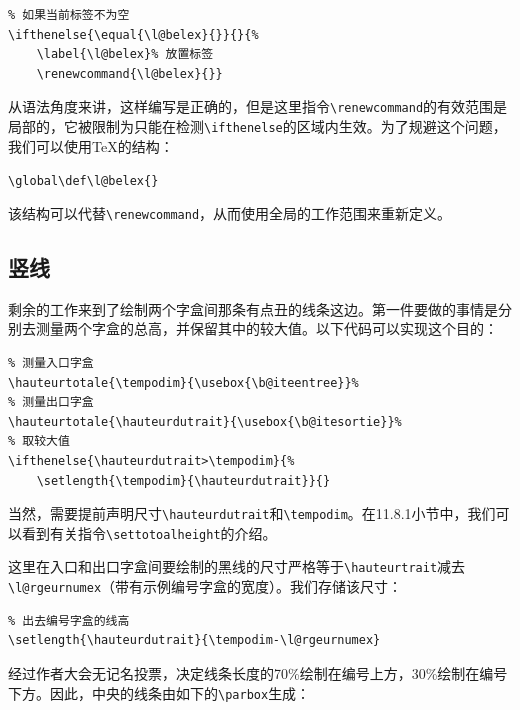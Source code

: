 \begin{dmd}
\begin{verbatim}
% 如果当前标签不为空 
\ifthenelse{\equal{\l@belex}{}}{}{%
    \label{\l@belex}% 放置标签
    \renewcommand{\l@belex}{}}\end{verbatim}
\end{dmd}

从语法角度来讲，这样编写是正确的，但是这里指令\verb|\renewcommand|的有效范围是局部的，它被限制为只能在检测\verb|\ifthenelse|的区域内生效。为了规避这个问题，我们可以使用\TeX 的结构：

\begin{dmd}
\verb|\global\def\l@belex{}|
\end{dmd}

该结构可以代替\verb|\renewcommand|，从而使用全局的工作范围来重新定义。

\subsection{竖线}

剩余的工作来到了绘制两个字盒间那条有点丑的线条这边。第一件要做的事情是分别去测量两个字盒的总高，并保留其中的较大值。以下代码可以实现这个目的：

\begin{dmd}
\begin{verbatim}
% 测量入口字盒
\hauteurtotale{\tempodim}{\usebox{\b@iteentree}}%
% 测量出口字盒
\hauteurtotale{\hauteurdutrait}{\usebox{\b@itesortie}}% 
% 取较大值
\ifthenelse{\hauteurdutrait>\tempodim}{%
    \setlength{\tempodim}{\hauteurdutrait}}{}\end{verbatim}
\end{dmd}

当然，需要提前声明尺寸\verb|\hauteurdutrait|和\verb|\tempodim|。在11.8.1小节中，我们可以看到有关指令\verb|\settotoalheight|的介绍。

这里在入口和出口字盒间要绘制的黑线的尺寸严格等于\verb|\hauteurtrait|减去\verb|\l@rgeurnumex|（带有示例编号字盒的宽度）。我们存储该尺寸：

\begin{dmd}
\begin{verbatim}
% 出去编号字盒的线高
\setlength{\hauteurdutrait}{\tempodim-\l@rgeurnumex}\end{verbatim}
\end{dmd}

经过作者大会无记名投票，决定线条长度的70\%绘制在编号上方，30\%绘制在编号下方。因此，中央的线条由如下的\verb|\parbox|生成：

